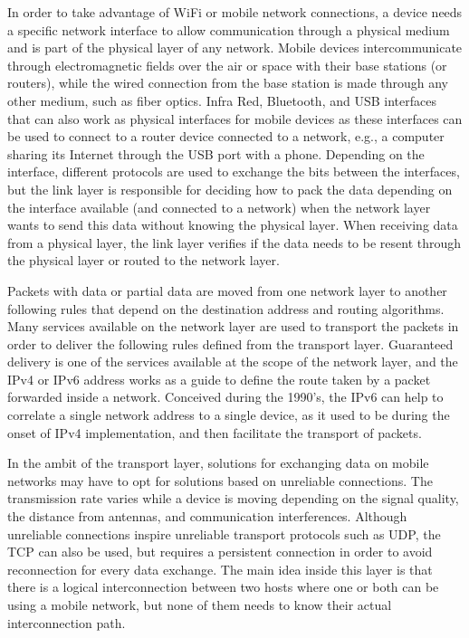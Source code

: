 In order to take advantage of WiFi or mobile network connections, a device needs a specific network interface to allow communication through a physical medium and is part of the physical layer of any network.
Mobile devices intercommunicate through electromagnetic fields over the air or space with their base stations (or routers), while the wired connection from the base station is made through any other medium, such as fiber optics.
Infra Red, Bluetooth, and USB interfaces that can also work as physical interfaces for mobile devices as these interfaces can be used to connect to a router device connected to a network, e.g., a computer sharing its Internet through the USB port with a phone.
Depending on the interface, different protocols are used to exchange the bits between the interfaces, but the link layer is responsible for deciding how to pack the data depending on the interface available (and connected to a network) when the network layer wants to send this data without knowing the physical layer.
When receiving data from a physical layer, the link layer verifies if the data needs to be resent through the physical layer or routed to the network layer.

Packets with data or partial data are moved from one network layer to another following rules that depend on the destination address and routing algorithms.
Many services available on the network layer are used to transport the packets in order to deliver the following rules defined from the transport layer.
Guaranteed delivery is one of the services available at the scope of the network layer, and the IPv4 or IPv6 address works as a guide to define the route taken by a packet forwarded inside a network.
Conceived during the 1990's, the IPv6 can help to correlate a single network address to a single device, as it used to be during the onset of IPv4 implementation, and then facilitate the transport of packets.

In the ambit of the transport layer, solutions for exchanging data on mobile networks may have to opt for solutions based on unreliable connections.
The transmission rate varies while a device is moving depending on the signal quality, the distance from antennas, and communication interferences.
Although unreliable connections inspire unreliable transport protocols such as UDP, the TCP can also be used, but requires a persistent connection in order to avoid reconnection for every data exchange.
The main idea inside this layer is that there is a logical interconnection between two hosts where one or both can be using a mobile network, but none of them needs to know their actual interconnection path.


